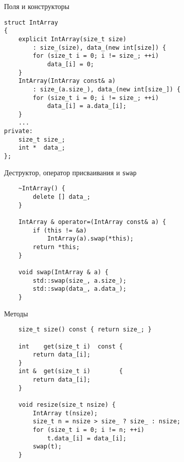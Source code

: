 \documentclass{beamer}
\begin{document}
\begin{frame}[fragile]{Поля и конструкторы}{}
\begin{lstlisting}
struct IntArray 
{
    explicit IntArray(size_t size) 
        : size_(size), data_(new int[size]) {
        for (size_t i = 0; i != size_; ++i)
            data_[i] = 0;
    }
    IntArray(IntArray const& a) 
        : size_(a.size_), data_(new int[size_]) {
        for (size_t i = 0; i != size_; ++i)
            data_[i] = a.data_[i];    
    }
    ...
private:
    size_t size_;
    int *  data_;
};
\end{lstlisting}
\end{frame}

\begin{frame}[fragile]{Деструктор, оператор присваивания и {\tt swap}}{}
\begin{lstlisting}
    ~IntArray() {
        delete [] data_;
    }

    IntArray & operator=(IntArray const& a) {
        if (this != &a)
            IntArray(a).swap(*this);
        return *this;
    }

    void swap(IntArray & a) {
        std::swap(size_, a.size_);
        std::swap(data_, a.data_);
    }
\end{lstlisting}
\end{frame}

\begin{frame}[fragile]{Методы}{}
\begin{lstlisting}
    size_t size() const { return size_; }

    int    get(size_t i)  const { 
        return data_[i]; 
    }
    int &  get(size_t i)        { 
        return data_[i]; 
    }

    void resize(size_t nsize) {
        IntArray t(nsize);
        size_t n = nsize > size_ ? size_ : nsize;
        for (size_t i = 0; i != n; ++i)
            t.data_[i] = data_[i];
        swap(t);
    }
\end{lstlisting}
\end{frame}
\end{document}

